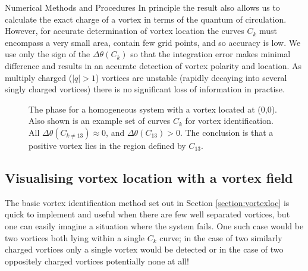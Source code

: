 \begin{chapter}{\label{cha:numerics}Numerical Methods and Procedures}
In principle the result also allows us to calculate the exact charge of a vortex in terms of the quantum of circulation. However, for accurate determination of vortex location the curves $C_k$ must encompass a very small area, contain few grid points, and so accuracy is low. We use only the sign of the $\Delta\theta(C_k)$ so that the integration error makes minimal difference and results in an accurate detection of vortex polarity and location. As multiply charged ($|q|>1$) vortices are unstable (rapidly decaying into several singly charged vortices) there is no significant loss of information in practise.
\begin{figure}
  \centering
  \caption{The phase for a homogeneous system with a vortex located at (0,0). Also shown is an example set of curves $C_k$ for vortex identification. All $\Delta\theta(C_{k\neq13})\approx0$, and $\Delta\theta(C_{13})>0$. The conclusion is that a positive vortex lies in the region defined by $C_{13}$.}
 \end{figure}
\subsection{\label{section:vortexfield} Visualising vortex location with a vortex field}
The basic vortex identification method set out in Section \ref{section:vortexloc} is quick to implement and useful when there are few well separated vortices, but one can easily imagine a situation where the system fails. One such case would be two vortices both lying within a single $C_k$ curve; in the case of two similarly charged vortices only a single vortex would be detected or in the case of two oppositely charged vortices potentially none at all!


\end{chapter}
